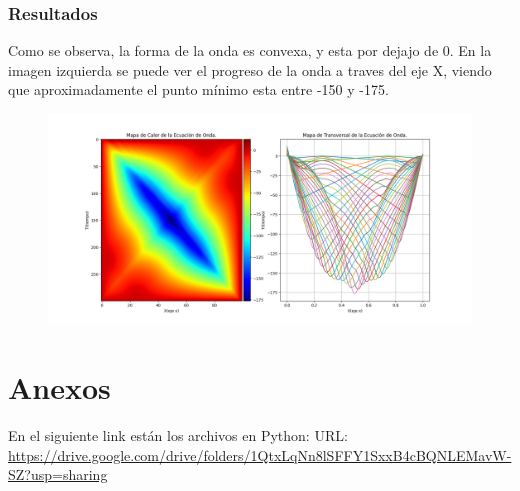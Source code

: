 \documentclass[a4paper,12pt]{article}
\begin{document}
    \subsubsection{Resultados}
    Como se observa, la forma de la onda es convexa, y esta por dejajo de 0. 
    En la imagen izquierda se puede ver el progreso de la onda a traves del eje X, viendo 
    que aproximadamente el punto mínimo esta entre -150 y -175.
    \begin{figure}[h]
        \centering
        \includegraphics[width=\textwidth]{graph5.png}
    \end{figure}
    \section{Anexos}
    En el siguiente link están los archivos en Python:
    URL:\\ 
    \url{https://drive.google.com/drive/folders/1QtxLqNn8lSFFY1SxxB4cBQNLEMavW-SZ?usp=sharing}
\end{document}
